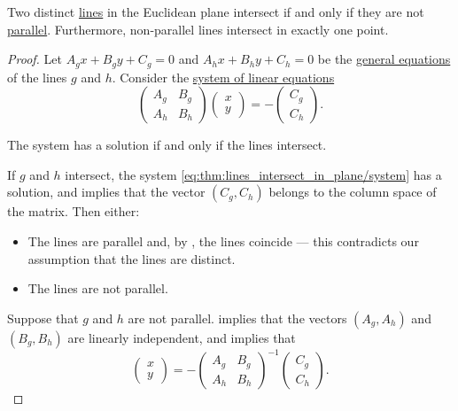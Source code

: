 \begin{proposition}\label{thm:lines_intersect_in_plane}
  Two distinct \hyperref[def:affine_line]{lines} in the Euclidean plane intersect if and only if they are not \hyperref[def:affine_parallelism]{parallel}. Furthermore, non-parallel lines intersect in exactly one point.
\end{proposition}
\begin{proof}
  Let \( A_g x + B_g y + C_g = 0 \) and \( A_h x + B_h y + C_h = 0 \) be the \hyperref[def:plane_line_equations/general]{general equations} of the lines \( g \) and \( h \). Consider the \hyperref[rem:system_of_equations]{system of linear equations}
  \begin{equation}\label{eq:thm:lines_intersect_in_plane/system}
    \begin{pmatrix}
      A_g & B_g \\
      A_h & B_h
    \end{pmatrix}
    \begin{pmatrix}
      x \\ y
    \end{pmatrix}
    =
    -
    \begin{pmatrix}
      C_g \\ C_h
    \end{pmatrix}.
  \end{equation}

  The system has a solution if and only if the lines intersect.

  \SufficiencySubProof If \( g \) and \( h \) intersect, the system \eqref{eq:thm:lines_intersect_in_plane/system} has a solution, and  implies that the vector \( (C_g, C_h) \) belongs to the column space of the matrix. Then either:
  \begin{itemize}
    \item The lines are parallel and, by , the lines coincide --- this contradicts our assumption that the lines are distinct.
    \item The lines are not parallel.
  \end{itemize}

  \NecessitySubProof Suppose that \( g \) and \( h \) are not parallel.  implies that the vectors \( (A_g, A_h) \) and \( (B_g, B_h) \) are linearly independent, and  implies that
  \begin{equation*}
    \begin{pmatrix}
      x \\ y
    \end{pmatrix}
    =
    -
    \begin{pmatrix}
      A_g & B_g \\
      A_h & B_h
    \end{pmatrix}^{-1}
    \begin{pmatrix}
      C_g \\ C_h
    \end{pmatrix}.
  \end{equation*}


\end{proof}
